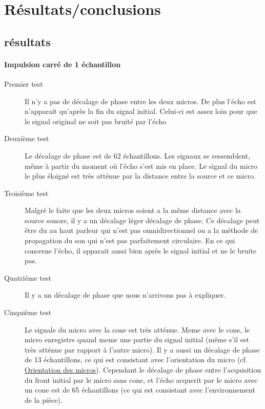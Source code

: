 \documentclass[12pt,a4paper]{report}
\begin{document}
\section{Résultats/conclusions}
\subsection{résultats}
\paragraph{Impulsion carré de 1 échantillon}
\begin{description}
\item[Premier test] Il n'y a pas de décalage de phase entre les deux micros. De plus l'écho est n'apparait qu'après la fin du signal initial. Celui-ci est assez loin pour que le signal original ne soit pas bruité par l'écho
\item[Deuxième test] \label{test1sample1} Le décalage de phase est de 62 échantillons. Les signaux se ressemblent, même à partir du moment où l'écho s'est mis en place. Le signal du micro le plus éloigné est très atténue par la distance entre la source et ce micro.
\item[Troisième test] Malgré le faite que les deux micros soient a la même distance avec la source sonore, il y a un décalage léger décalage de phase. Ce décalage peut être du au haut parleur qui n'est pas omnidirectionnel ou a la méthode de propagation du son qui n'est pas parfaitement circulaire. En ce qui concerne l'écho, il apparait aussi bien après le signal initial et ne le bruite pas.
\item[Quatrième test] Il y a un décalage de phase que nous n'arrivons pas à expliquer.
\item[Cinquième test] Le signale du micro avec la cone est très atténue. Meme avec le cone, le micro enregistre quand meme une partie du signal initial (même s'il est très atténue par rapport à l'autre micro). Il y a aussi un décalage de phase de 13 échantillons, ce qui est consistant avec l'orientation du micro (cf. \hyperref[orientation_micro]{Orientation des micros}). Cependant le décalage de phase entre l'acquisition du front initial par le micro sans cone, et l'écho acquerit par le micro avec un cone est de 65 échantillons (ce qui est consistant avec l'environnement de la pièce).
\end{description}
\end{document}
